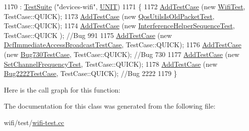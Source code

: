 \begin{DoxyCode}
1170   : \hyperlink{classns3_1_1TestSuite_a904b0c40583b744d30908aeb94636d1a}{TestSuite} (\textcolor{stringliteral}{"devices-wifi"}, \hyperlink{classns3_1_1TestSuite_a1ebfcab34ec8161e085e8e3a1855eae0a3885375a3787abf60431f8454b3cadbd}{UNIT})
1171 \{
1172   \hyperlink{classns3_1_1TestCase_a3718088e3eefd5d6454569d2e0ddd835}{AddTestCase} (\textcolor{keyword}{new} \hyperlink{classWifiTest}{WifiTest}, TestCase::QUICK);
1173   \hyperlink{classns3_1_1TestCase_a3718088e3eefd5d6454569d2e0ddd835}{AddTestCase} (\textcolor{keyword}{new} \hyperlink{classQosUtilsIsOldPacketTest}{QosUtilsIsOldPacketTest}, TestCase::QUICK);
1174   \hyperlink{classns3_1_1TestCase_a3718088e3eefd5d6454569d2e0ddd835}{AddTestCase} (\textcolor{keyword}{new} \hyperlink{classInterferenceHelperSequenceTest}{InterferenceHelperSequenceTest}, TestCase::QUICK
      ); \textcolor{comment}{//Bug 991}
1175   \hyperlink{classns3_1_1TestCase_a3718088e3eefd5d6454569d2e0ddd835}{AddTestCase} (\textcolor{keyword}{new} \hyperlink{classDcfImmediateAccessBroadcastTestCase}{DcfImmediateAccessBroadcastTestCase}, 
      TestCase::QUICK);
1176   \hyperlink{classns3_1_1TestCase_a3718088e3eefd5d6454569d2e0ddd835}{AddTestCase} (\textcolor{keyword}{new} \hyperlink{classBug730TestCase}{Bug730TestCase}, TestCase::QUICK); \textcolor{comment}{//Bug 730}
1177   \hyperlink{classns3_1_1TestCase_a3718088e3eefd5d6454569d2e0ddd835}{AddTestCase} (\textcolor{keyword}{new} \hyperlink{classSetChannelFrequencyTest}{SetChannelFrequencyTest}, TestCase::QUICK);
1178   \hyperlink{classns3_1_1TestCase_a3718088e3eefd5d6454569d2e0ddd835}{AddTestCase} (\textcolor{keyword}{new} \hyperlink{classBug2222TestCase}{Bug2222TestCase}, TestCase::QUICK); \textcolor{comment}{//Bug 2222}
1179 \}
\end{DoxyCode}


Here is the call graph for this function\+:




The documentation for this class was generated from the following file\+:\begin{DoxyCompactItemize}
\item 
wifi/test/\hyperlink{wifi-test_8cc}{wifi-\/test.\+cc}\end{DoxyCompactItemize}
